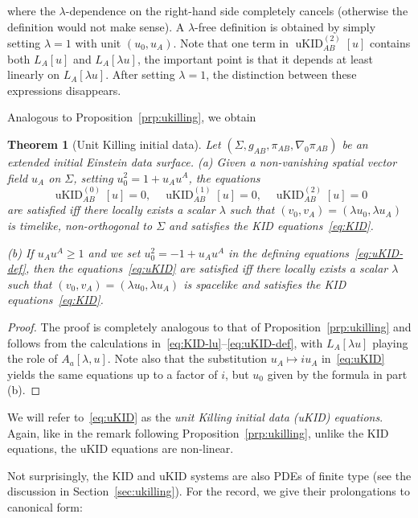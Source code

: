 \documentclass[a4paper]{article}
\newtheorem{thm}{Theorem}
\theoremstyle{remark}
\newcommand{\la}{\lambda}
\newcommand{\uKIDo}{\operatorname{uKID}^{(0)}}
\newcommand{\uKIDi}{\operatorname{uKID}^{(1)}}
\newcommand{\uKIDii}{\operatorname{uKID}^{(2)}}
\begin{document}
where the $\la$-dependence on the right-hand side completely cancels
(otherwise the definition would not make sense). A $\la$-free definition
is obtained by simply setting $\la = 1$ with unit $(u_0,u_A)$. Note that
one term in $\uKIDii_{AB}[u]$ contains both $L_A[u]$ and $L_A[\lambda
u]$, the important point is that it depends at least linearly on
$L_A[\lambda u]$. After setting $\lambda = 1$, the distinction between
these expressions disappears.

Analogous to Proposition~\ref{prp:ukilling}, we obtain
\begin{thm}[Unit Killing initial data] \label{thm:uKID}
Let $(\Sigma, g_{AB}, \pi_{AB}, \nabla_0\pi_{AB})$ be an extended
initial Einstein data surface.
(a) Given a non-vanishing spatial vector field $u_A$ on $\Sigma$, setting
$u_0^2 = 1 + u_A u^A$, the equations
\begin{equation} \label{eq:uKID}
	\uKIDo_{AB}[u] = 0 , \quad
	\uKIDi_{AB}[u] = 0 , \quad
	\uKIDii_{AB}[u] = 0
\end{equation}
are satisfied iff there locally exists a scalar $\la$ such that $(v_0,
v_A) = (\la u_0, \la u_A)$ is timelike, non-orthogonal to $\Sigma$ and
satisfies the KID equations~\eqref{eq:KID}.

(b) If $u_A u^A \ge 1$ and we set $u_0^2 = -1 + u_A u^A$ in the defining
equations~\eqref{eq:uKID-def}, then the equations~\eqref{eq:uKID}
are satisfied iff there locally exists a scalar $\la$ such that $(v_0,
v_A) = (\la u_0, \la u_A)$ is spacelike and satisfies the KID
equations~\eqref{eq:KID}.
\end{thm}
\begin{proof}
The proof is completely analogous to that of
Proposition~\ref{prp:ukilling} and follows from the calculations
in~\eqref{eq:KID-lu}--\eqref{eq:uKID-def}, with $L_A[\la u]$ playing the
role of $A_a[\la,u]$. Note also that the substitution $u_A \mapsto i
u_A$ in~\eqref{eq:uKID} yields the same equations up to a factor of $i$,
but $u_0$ given by the formula in part (b).
\end{proof}
We will refer to~\eqref{eq:uKID} as the \emph{unit Killing initial data
(uKID) equations}. Again, like in the remark following
Proposition~\ref{prp:ukilling}, unlike the KID equations, the uKID
equations are non-linear.

Not surprisingly, the KID and uKID systems are also PDEs of finite type
(see the discussion in Section~\ref{sec:ukilling}). For the record, we
give their prolongations to canonical form:
\end{document}
